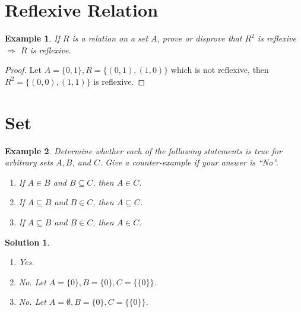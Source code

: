 \documentclass{../../cls/sig-alternate-05-2015}
\newtheorem{example}{Example}
\newtheorem*{solution*}{Solution}
\begin{document}
\section{Reflexive Relation}
\begin{example}
    If $R$ is a relation on a set $A$, prove or disprove that $R^2$ is reflexive $\Rightarrow$ $R$ is reflexive.
\end{example}
\begin{proof}
    Let $A = \{0, 1\}, R = \{(0, 1), (1, 0)\}$ which is not reflexive, then $R^2 = \{(0, 0), (1, 1)\}$ is reflexive.
\end{proof}

\section{Set}
\begin{example}
    Determine  whether each of the following statements is true for arbitrary sets $A, B$, and $C$. Give a counter-example if your answer is ``No''.\begin{enumerate}
        \item If $A \in B$ and $B \subseteq C$, then $A \in C$.
        \item If $A \subseteq B$ and $B \in C$, then $A \subseteq C$.
        \item If $A \subseteq B$ and $B \in C$, then $A \in C$.
    \end{enumerate}
\end{example}
\begin{solution*}
    \begin{enumerate}
        \item Yes.
        \item No. Let $A = \{0\}, B = \{0\}, C = \{\{0\}\}$.
        \item No. Let $A = \emptyset, B = \{0\}, C = \{\{0\}\}$.
    \end{enumerate}
\end{solution*}
\end{document}
